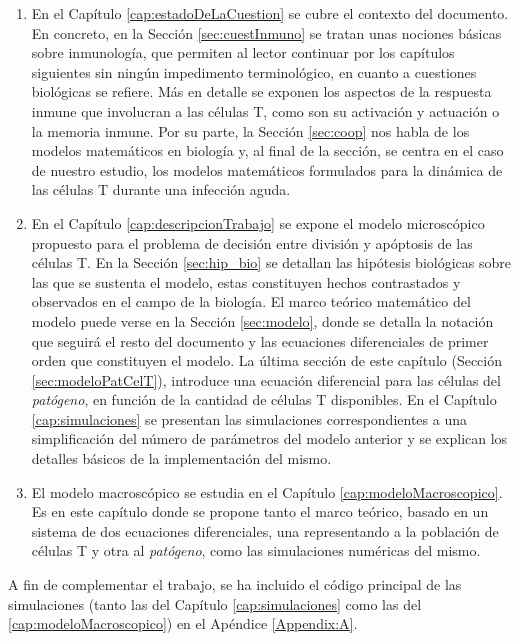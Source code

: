 \begin{enumerate}
	\item En el Capítulo \ref{cap:estadoDeLaCuestion} se cubre el contexto del documento. En concreto, en la Sección \ref{sec:cuestInmuno} se tratan unas nociones básicas sobre inmunología, que permiten al lector continuar por los capítulos siguientes sin ningún impedimento terminológico, en cuanto a cuestiones biológicas se refiere. Más en detalle se exponen los aspectos de la respuesta inmune que involucran a las células T, como son su activación y actuación o la memoria inmune. Por su parte, la Sección \ref{sec:coop} nos habla de los modelos matemáticos en biología y, al final de la sección, se centra en el caso de nuestro estudio, los modelos matemáticos formulados para la dinámica de las células T durante una infección aguda. 
	
	\item En el Capítulo \ref{cap:descripcionTrabajo} se expone el modelo microscópico propuesto para el problema de decisión entre división y apóptosis de las células T. En la Sección \ref{sec:hip_bio} se detallan las hipótesis biológicas sobre las que se sustenta el modelo, estas constituyen hechos contrastados y observados en el campo de la biología. El marco teórico matemático del modelo puede verse en la Sección \ref{sec:modelo}, donde se detalla la notación que seguirá el resto del documento y las ecuaciones diferenciales de primer orden que constituyen el modelo. La última sección de este capítulo (Sección \ref{sec:modeloPatCelT}), introduce una ecuación diferencial para las células del \textit{patógeno}, en función de la cantidad de células T disponibles. En el Capítulo \ref{cap:simulaciones} se presentan las simulaciones correspondientes a una simplificación del número de parámetros del modelo anterior y se explican los detalles básicos de la implementación del mismo.
	
	\item El modelo macroscópico se estudia en el Capítulo \ref{cap:modeloMacroscopico}. Es en este capítulo donde se propone tanto el marco teórico, basado en un sistema de dos ecuaciones diferenciales, una representando a la población de células T y otra al \textit{patógeno}, como las simulaciones numéricas del mismo. 
\end{enumerate}

A fin de complementar el trabajo, se ha incluido el código principal de las simulaciones (tanto las del Capítulo \ref{cap:simulaciones} como las del \ref{cap:modeloMacroscopico}) en el Apéndice \ref{Appendix:A}.






